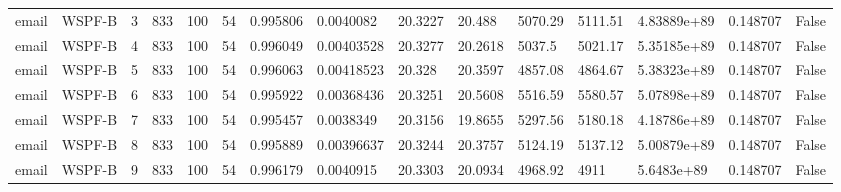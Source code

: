 \begin{tabular}{lllllllllllllll}
email & WSPF-B & 3 & 833 & 100 & 54 & 0.995806 & 0.0040082 & 20.3227 & 20.488 & 5070.29 & 5111.51 & 4.83889e+89 & 0.148707 & False \\
email & WSPF-B & 4 & 833 & 100 & 54 & 0.996049 & 0.00403528 & 20.3277 & 20.2618 & 5037.5 & 5021.17 & 5.35185e+89 & 0.148707 & False \\
email & WSPF-B & 5 & 833 & 100 & 54 & 0.996063 & 0.00418523 & 20.328 & 20.3597 & 4857.08 & 4864.67 & 5.38323e+89 & 0.148707 & False \\
email & WSPF-B & 6 & 833 & 100 & 54 & 0.995922 & 0.00368436 & 20.3251 & 20.5608 & 5516.59 & 5580.57 & 5.07898e+89 & 0.148707 & False \\
email & WSPF-B & 7 & 833 & 100 & 54 & 0.995457 & 0.0038349 & 20.3156 & 19.8655 & 5297.56 & 5180.18 & 4.18786e+89 & 0.148707 & False \\
email & WSPF-B & 8 & 833 & 100 & 54 & 0.995889 & 0.00396637 & 20.3244 & 20.3757 & 5124.19 & 5137.12 & 5.00879e+89 & 0.148707 & False \\
email & WSPF-B & 9 & 833 & 100 & 54 & 0.996179 & 0.0040915 & 20.3303 & 20.0934 & 4968.92 & 4911 & 5.6483e+89 & 0.148707 & False \\
\hline
\end{tabular}
